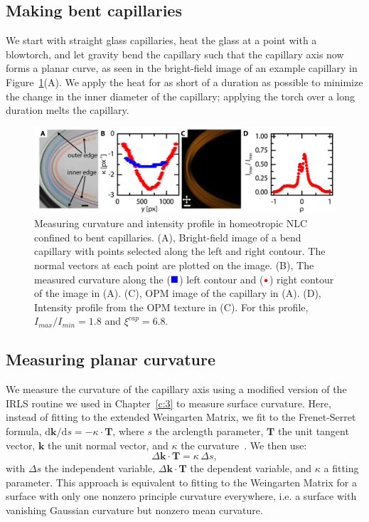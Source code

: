 \subsection{Making bent capillaries}
We start with straight glass capillaries, heat the glass at a point with a blowtorch, and let gravity bend the capillary such that the capillary axis now forms a planar curve, as seen in the bright-field image of an example capillary in Figure~\ref{f:4-BentCaps}(A).
We apply the heat for as short of a duration as possible to minimize the change in the inner diameter of the capillary; applying the torch over a long duration melts the capillary.
\begin{figure}
  \centering
  \includegraphics{figures/C4/Ch4-Figs_BentCaps.png}
  \caption{Measuring curvature and intensity profile in homeotropic NLC confined to bent capillaries.
  (A), Bright-field image of a bend capillary with points selected along the left and right contour.
  The normal vectors at each point are plotted on the image.
  (B), The measured curvature along the (${\color{blue} \blacksquare}$) left contour and (${\color{red} \bullet}$) right contour of the image in (A).
  (C), OPM image of the capillary in (A).
  (D), Intensity profile from the OPM texture in (C).
  For this profile, $I_{max}/I_{min} = 1.8$ and $\xi^{cap} = 6.8$.}\label{f:4-BentCaps}
\end{figure}

\subsection{Measuring planar curvature}
We measure the curvature of the capillary axis using a modified version of the IRLS routine we used in Chapter~\ref{c:3} to measure surface curvature.
Here, instead of fitting to the extended Weingarten Matrix, we fit to the Frenet-Serret formula, $\textrm{d}\mathbf{k}/\textrm{d}s = -\kappa \cdot \mathbf{T}$, where $s$ the arclength parameter, $\mathbf{T}$ the unit tangent vector, $\mathbf{k}$ the unit normal vector, and $\kappa$ the curvature~\cite{RN23}.
We then use:
\begin{equation}
  \Delta \mathbf{k} \cdot \mathbf{T} = \kappa \, \Delta s,\label{e:4-FSfit}
\end{equation}
with $\Delta s$ the independent variable, $\Delta \mathbf{k} \cdot \mathbf{T}$ the dependent variable, and $\kappa$ a fitting parameter.
This approach is equivalent to fitting to the Weingarten Matrix for a surface with only one nonzero principle curvature everywhere, i.e. a surface with vanishing Gaussian curvature but nonzero mean curvature.

